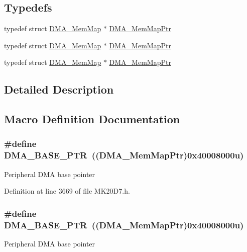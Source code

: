 \subsection*{Typedefs}
\begin{DoxyCompactItemize}
\item 
typedef struct \hyperlink{struct_d_m_a___mem_map}{D\+M\+A\+\_\+\+Mem\+Map} $\ast$ \hyperlink{group___d_m_a___peripheral_ga160c27c95a39a9791079b32fe7e843a1}{D\+M\+A\+\_\+\+Mem\+Map\+Ptr}
\item 
typedef struct \hyperlink{struct_d_m_a___mem_map}{D\+M\+A\+\_\+\+Mem\+Map} $\ast$ \hyperlink{group___d_m_a___peripheral_ga160c27c95a39a9791079b32fe7e843a1}{D\+M\+A\+\_\+\+Mem\+Map\+Ptr}
\item 
typedef struct \hyperlink{struct_d_m_a___mem_map}{D\+M\+A\+\_\+\+Mem\+Map} $\ast$ \hyperlink{group___d_m_a___peripheral_ga160c27c95a39a9791079b32fe7e843a1}{D\+M\+A\+\_\+\+Mem\+Map\+Ptr}
\end{DoxyCompactItemize}


\subsection{Detailed Description}


\subsection{Macro Definition Documentation}
\subsubsection[{\texorpdfstring{D\+M\+A\+\_\+\+B\+A\+S\+E\+\_\+\+P\+TR}{DMA_BASE_PTR}}]{\setlength{\rightskip}{0pt plus 5cm}\#define D\+M\+A\+\_\+\+B\+A\+S\+E\+\_\+\+P\+TR~(({\bf D\+M\+A\+\_\+\+Mem\+Map\+Ptr})0x40008000u)}\hypertarget{group___d_m_a___peripheral_ga6997fbc1b1973e9f27170217a3bd6f22}{}\label{group___d_m_a___peripheral_ga6997fbc1b1973e9f27170217a3bd6f22}
Peripheral D\+MA base pointer 

Definition at line 3669 of file M\+K20\+D7.\+h.

\subsubsection[{\texorpdfstring{D\+M\+A\+\_\+\+B\+A\+S\+E\+\_\+\+P\+TR}{DMA_BASE_PTR}}]{\setlength{\rightskip}{0pt plus 5cm}\#define D\+M\+A\+\_\+\+B\+A\+S\+E\+\_\+\+P\+TR~(({\bf D\+M\+A\+\_\+\+Mem\+Map\+Ptr})0x40008000u)}\hypertarget{group___d_m_a___peripheral_ga6997fbc1b1973e9f27170217a3bd6f22}{}\label{group___d_m_a___peripheral_ga6997fbc1b1973e9f27170217a3bd6f22}
Peripheral D\+MA base pointer 

